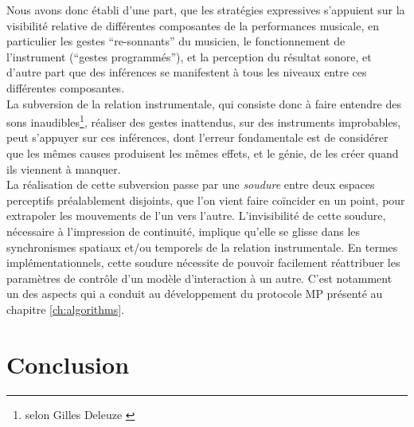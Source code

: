 \noindent Nous avons donc établi d'une part, que les stratégies expressives s'appuient sur la visibilité relative de différentes composantes de la performances musicale, en particulier les gestes ``re-sonnants'' du musicien, le fonctionnement de l'instrument (``gestes programmés''), et la perception du résultat sonore, et d'autre part que des inférences se manifestent à tous les niveaux entre ces différentes composantes.\\
\indent La subversion de la relation instrumentale, qui consiste donc à faire entendre des sons inaudibles\footnote{ selon Gilles Deleuze \cite{deleuze_francis_1981}}, réaliser des gestes inattendus, sur des instruments improbables, peut s'appuyer sur ces inférences, dont l'erreur fondamentale est de considérer que les mêmes causes produisent les mêmes effets, et le génie, de les créer quand ils viennent à manquer.\\
\indent La réalisation de cette subversion passe par une \textit{soudure} entre deux espaces perceptifs préalablement disjoints, que l'on vient faire coïncider en un point, pour extrapoler les mouvements de l'un vers l'autre. L'invisibilité de cette soudure, nécessaire à l'impression de continuité, implique qu'elle se glisse dans les synchronismes spatiaux et/ou temporels de la relation instrumentale. 
En termes implémentationnels, cette soudure nécessite de pouvoir facilement réattribuer les paramètres de contrôle d'un modèle d'interaction à un autre. C'est notamment un des aspects qui a conduit au développement du protocole MP présenté au chapitre \ref{ch:algorithms}.

\section{Conclusion}
\label{sec:gesture:conclusion}

